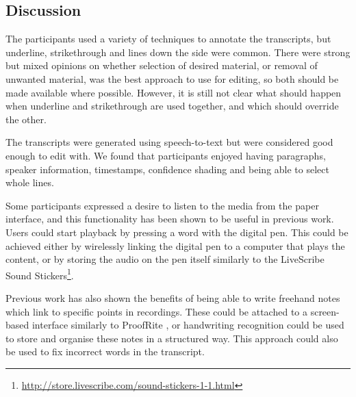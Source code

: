\subsection{Discussion}
The participants used a variety of techniques to annotate the transcripts, 
but underline, strikethrough and lines down the side were common. There were
strong but mixed opinions on whether selection of desired material, or removal
of unwanted material, was the best approach to use for editing, so both should
be made available where possible. However, it is still not clear what should
happen when underline and strikethrough are used together, and which should
override the other.

The transcripts were generated using speech-to-text but were considered good
enough to edit with. We found that participants enjoyed having paragraphs, speaker
information, timestamps, confidence shading and being able to select whole lines.

Some participants expressed a desire to listen to the media
from the paper interface, and this functionality has been shown to be useful
in previous work. Users could start playback by pressing a word with the
digital pen. This could be achieved either by wirelessly
linking the digital pen to a computer that plays the content, or by storing
the audio on the pen itself similarly to the LiveScribe Sound
Stickers\footnote{\url{http://store.livescribe.com/sound-stickers-1-1.html}}.

Previous work has also shown the benefits of being able to write freehand notes
which link to specific points in recordings. These could be attached to a
screen-based interface similarly to ProofRite \citep{Conroy2004}, or handwriting
recognition could be used to store and organise these notes in a structured
way. This approach could also be used to fix incorrect words in the transcript.

